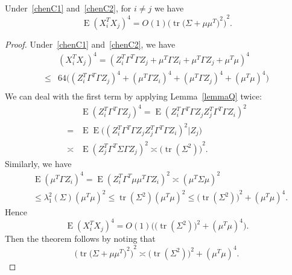 \documentclass[smallcondensed,final,natbib]{svjour3}          %
\DeclareMathOperator{\mytr}{tr}
\DeclareMathOperator{\myE}{E}
\begin{document}
\begin{lemma}\label{smallLemma1}
    Under~\eqref{chenC1} and~\eqref{chenC2}, for $i\neq j$ we have
    \begin{equation}\label{eq:20170220}
        \myE{(X_i^T X_j)}^4=%
             O(1){\Big(\mytr {\big(\Sigma+\mu\mu^T\big)}^2\Big)}^2.
    \end{equation}
\end{lemma}
\begin{proof}

    Under~\eqref{chenC1} and~\eqref{chenC2}, we have
        \begin{equation*}
        \begin{aligned}
            &{(X_i^T X_j)}^4=
            {(Z_i^T \Gamma^T \Gamma Z_j+\mu^T \Gamma Z_i+\mu^T \Gamma Z_j+\mu^T \mu)}^4\\
            \leq &
            64\big((Z_i^T \Gamma^T \Gamma Z_j)^4+(\mu^T \Gamma Z_i)^4+(\mu^T \Gamma Z_j)^4+(\mu^T \mu)^4\big)\\
        \end{aligned}
        \end{equation*}
    We can deal with the first term by applying Lemma~\ref{lemmaQ} twice:
        \begin{equation*}
        \begin{aligned}
            &\myE(Z_i^T \Gamma^T \Gamma Z_j)^4=
        \myE(Z_i^T \Gamma^T \Gamma Z_j Z_j^T \Gamma^T \Gamma Z_i)^2\\
            =&
            \myE\myE\big((Z_i^T \Gamma^T \Gamma Z_j Z_j^T \Gamma^T \Gamma Z_i)^2 | Z_j\big)\\
            \asymp &  \myE{(Z_j^T \Gamma^T \Sigma \Gamma Z_j)}^2
            \asymp   {\big(\mytr (\Sigma^2)\big)}^2.%
        \end{aligned}
        \end{equation*}
    Similarly, we have
        \begin{equation*}
        \begin{aligned}
            &\myE(\mu^T \Gamma Z_i)^4=
        \myE(Z_i^T \Gamma^T \mu\mu^T \Gamma Z_i)^2
            \asymp  {(\mu^T \Sigma \mu)}^2\\
            &\leq \lambda_{1}^2(\Sigma){(\mu^T \mu)}^2
        \leq \mytr (\Sigma^2){(\mu^T \mu)}^2
            \leq {\big(\mytr (\Sigma^2)\big)}^2+{(\mu^T \mu)}^4.
        \end{aligned}
        \end{equation*}
Hence
    \begin{equation*}
    \myE (X_i^T X_j)^4=O(1)\Big(\big(\mytr(\Sigma^2)\big)^2+(\mu^T \mu)^4\Big).
    \end{equation*}
Then the theorem follows by noting that
    \begin{equation*}
{\Big(\mytr {\big(\Sigma+\mu\mu^T\big)}^2\Big)}^2
\asymp
    \big(\mytr(\Sigma^2)\big)^2+(\mu^T \mu)^4.
    \end{equation*}
\end{proof}
\end{document}
